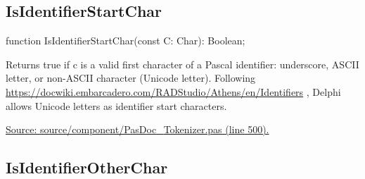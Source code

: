 \documentclass{report}
\newif\ifpdf
\begin{document}
\subsection*{IsIdentifierStartChar}
\fi
\label{PasDoc_Tokenizer-IsIdentifierStartChar}
\begin{list}{}{
\setlength{\itemindent}{0cm}
\setlength{\listparindent}{0cm}
\setlength{\leftmargin}{\evensidemargin}
\addtolength{\leftmargin}{\tmplength}
\settowidth{\labelsep}{X}
\addtolength{\leftmargin}{\labelsep}
\setlength{\labelwidth}{\tmplength}
}
\item[\textbf{Declaration}\hfill]
\ifpdf
\begin{flushleft}
\fi
\begin{ttfamily}
function IsIdentifierStartChar(const C: Char): Boolean;\end{ttfamily}

\ifpdf
\end{flushleft}
\fi

\par
\item[\textbf{Description}]
Returns true if c is a valid first character of a Pascal identifier: underscore, ASCII letter, or non{-}ASCII character (Unicode letter). Following \href{https://docwiki.embarcadero.com/RADStudio/Athens/en/Identifiers}{https://docwiki.embarcadero.com/RADStudio/Athens/en/Identifiers} , Delphi allows Unicode letters as identifier start characters.\par
\href{https://github.com/pasdoc/pasdoc/blob/master/source/component/PasDoc_Tokenizer.pas#L500}{Source: source/component/PasDoc{\_}Tokenizer.pas (line 500).}

\end{list}
\ifpdf
\subsection*{\large{\textbf{IsIdentifierOtherChar}}\normalsize\hspace{1ex}\hrulefill}
\else
\end{document}
